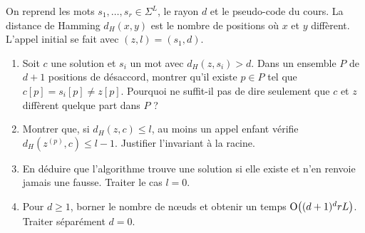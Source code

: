 \begin{td-exo}
    On reprend les mots \(s_1,\ldots,s_r \in \Sigma^L\), le rayon \(d\) et le pseudo-code du cours.
    La distance de Hamming \(d_H(x, y)\) est le nombre de positions où \(x\) et \(y\) diffèrent.
    L'appel initial se fait avec \((z, l) =  (s_1, d)\).

    \begin{enumerate}
        \item Soit \(c\) une solution et \(s_i\) un mot avec \(d_H(z, s_i) > d\).
        Dans un ensemble \(P\) de \(d+1\) positions de désaccord, montrer qu'il existe \(p \in P\) tel que \(c[p] = s_i[p] \neq z[p]\).
        Pourquoi ne suffit-il pas de dire seulement que \(c\) et \(z\) diffèrent quelque part dans \(P\) ?

        \item Montrer que, si \(d_H(z, c) \leq l\), au moins un appel enfant vérifie \(d_H(z^{(p)}, c) \leq l-1\).
        Justifier l'invariant à la racine.

        \item En déduire que l'algorithme trouve une solution si elle existe et n'en renvoie jamais une fausse.
        Traiter le cas \(l = 0\).

        \item Pour \(d\geq 1\), borner le nombre de nœuds et obtenir un temps \(\BigO{(d+1)^d r L}\).
        Traiter séparément \(d = 0\).
    \end{enumerate}
\end{td-exo}

